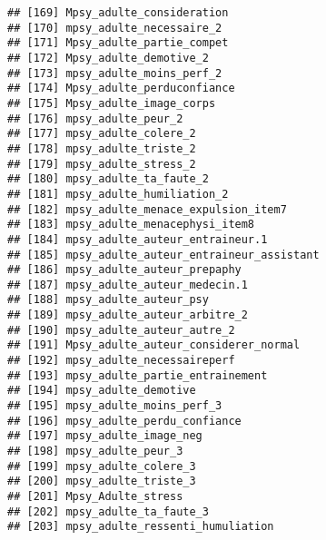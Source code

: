 \documentclass[
]{article}
\begin{document}
\begin{verbatim}
## [169] Mpsy_adulte_consideration                                        
## [170] mpsy_adulte_necessaire_2                                         
## [171] Mpsy_adulte_partie_compet                                        
## [172] Mpsy_adulte_demotive_2                                           
## [173] mpsy_adulte_moins_perf_2                                         
## [174] Mpsy_adulte_perduconfiance                                       
## [175] Mpsy_adulte_image_corps                                          
## [176] mpsy_adulte_peur_2                                               
## [177] mpsy_adulte_colere_2                                             
## [178] mpsy_adulte_triste_2                                             
## [179] mpsy_adulte_stress_2                                             
## [180] mpsy_adulte_ta_faute_2                                           
## [181] mpsy_adulte_humiliation_2                                        
## [182] mpsy_adulte_menace_expulsion_item7                               
## [183] mpsy_adulte_menacephysi_item8                                    
## [184] mpsy_adulte_auteur_entraineur.1                                  
## [185] mpsy_adulte_auteur_entraineur_assistant                          
## [186] mpsy_adulte_auteur_prepaphy                                      
## [187] mpsy_adulte_auteur_medecin.1                                     
## [188] mpsy_adulte_auteur_psy                                           
## [189] mpsy_adulte_auteur_arbitre_2                                     
## [190] mpsy_adulte_auteur_autre_2                                       
## [191] Mpsy_adulte_auteur_considerer_normal                             
## [192] mpsy_adulte_necessaireperf                                       
## [193] mpsy_adulte_partie_entrainement                                  
## [194] mpsy_adulte_demotive                                             
## [195] mpsy_adulte_moins_perf_3                                         
## [196] mpsy_adulte_perdu_confiance                                      
## [197] mpsy_adulte_image_neg                                            
## [198] mpsy_adulte_peur_3                                               
## [199] mpsy_adulte_colere_3                                             
## [200] mpsy_adulte_triste_3                                             
## [201] Mpsy_Adulte_stress                                               
## [202] mpsy_adulte_ta_faute_3                                           
## [203] mpsy_adulte_ressenti_humuliation                                 

\end{verbatim}
\end{document}

